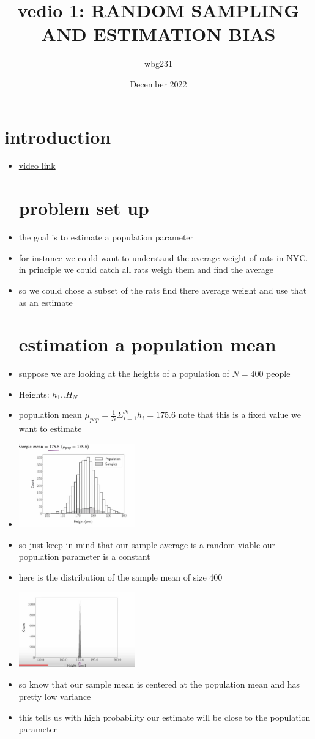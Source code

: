 \documentclass{article}
\title{vedio 1: RANDOM SAMPLING AND ESTIMATION BIAS}
\author{wbg231 }
\date{December 2022}
\begin{document}
\maketitle

\section{introduction}
\begin{itemize}
\item \href{https://www.youtube.com/watch?v=iPTTn-hPg_0}{video link}
\section{problem set up}
\item the goal is to estimate  a population parameter
\item for instance we could want to understand the average weight of rats in NYC. in principle we could catch all rats weigh them and find the average
\item so we could chose a subset of the rats find there average weight and use that as an estimate 
\section{estimation a population mean}
\item suppose we are looking at the heights of a population of $N=400$ people
\item Heights: $h_1..H_N$
\item population mean $\mu_{pop}=\frac{1}{N}\Sigma_{i=1}^{N}h_i=175.6$ note that this is a fixed value we want to estimate
\item\includegraphics[width=5cm]{notes/week_3/Video 1: RANDOM SAMPLING AND ESTIMATION BIAS/immages/v1_1.jpg}
\item so just keep in mind that our sample average is a random viable our population parameter is a constant 
\item here is the distribution of the sample mean of size 400 \item\includegraphics[width=5cm]{notes/week_3/Video 1: RANDOM SAMPLING AND ESTIMATION BIAS/immages/v2_2.jpg}
\item so know that our sample mean is centered at the population mean and has pretty low variance 
\item this tells us with high probability our estimate will be close to the population parameter 

\end{itemize}
\end{document}
